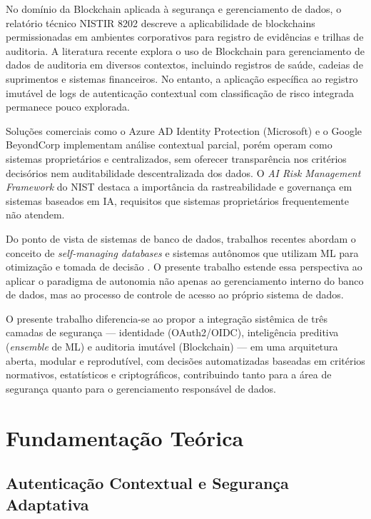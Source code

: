 \documentclass[12pt]{article}
\begin{document}
No domínio da Blockchain aplicada à segurança e gerenciamento de dados, o relatório técnico NISTIR 8202 \cite{nist2018blockchain} descreve a aplicabilidade de blockchains permissionadas em ambientes corporativos para registro de evidências e trilhas de auditoria. A literatura recente explora o uso de Blockchain para gerenciamento de dados de auditoria em diversos contextos, incluindo registros de saúde, cadeias de suprimentos e sistemas financeiros. No entanto, a aplicação específica ao registro imutável de logs de autenticação contextual com classificação de risco integrada permanece pouco explorada.

Soluções comerciais como o Azure AD Identity Protection (Microsoft) e o Google BeyondCorp implementam análise contextual parcial, porém operam como sistemas proprietários e centralizados, sem oferecer transparência nos critérios decisórios nem auditabilidade descentralizada dos dados. O \textit{AI Risk Management Framework} do NIST \cite{nist2023ai} destaca a importância da rastreabilidade e governança em sistemas baseados em IA, requisitos que sistemas proprietários frequentemente não atendem.

Do ponto de vista de sistemas de banco de dados, trabalhos recentes abordam o conceito de \textit{self-managing databases} e sistemas autônomos que utilizam ML para otimização e tomada de decisão \cite{scikit2024}. O presente trabalho estende essa perspectiva ao aplicar o paradigma de autonomia não apenas ao gerenciamento interno do banco de dados, mas ao processo de controle de acesso ao próprio sistema de dados.

O presente trabalho diferencia-se ao propor a integração sistêmica de três camadas de segurança --- identidade (OAuth2/OIDC), inteligência preditiva (\textit{ensemble} de ML) e auditoria imutável (Blockchain) --- em uma arquitetura aberta, modular e reprodutível, com decisões automatizadas baseadas em critérios normativos, estatísticos e criptográficos, contribuindo tanto para a área de segurança quanto para o gerenciamento responsável de dados.

\section{Fundamentação Teórica}

\subsection{Autenticação Contextual e Segurança Adaptativa}
\end{document}
